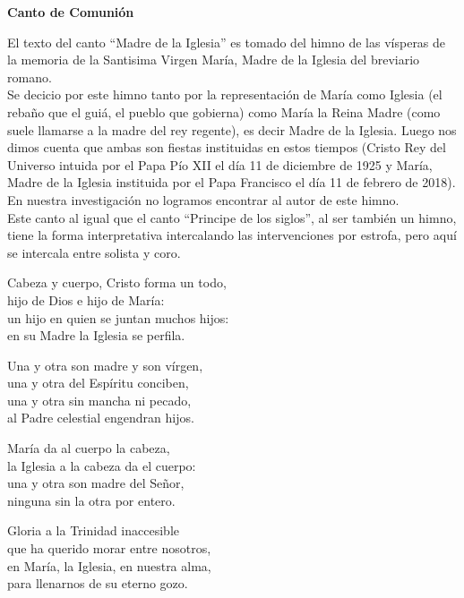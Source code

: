 \documentclass[12pt, letterpaper]{report}
\begin{document}
    \begin{center}
      \LARGE \textbf{Canto de Comuni\'on}
    \end{center}

    \Large El texto del canto ``Madre de la Iglesia'' es tomado del himno de las v\'isperas de la memoria de la Santisima Virgen Mar\'ia, Madre de la Iglesia del breviario romano.\\
    Se decicio por este himno tanto por la representaci\'on de Mar\'ia como Iglesia
    (el reba\~no que el gui\'a, el pueblo que gobierna) como Mar\'ia la Reina Madre (como suele llamarse a la madre del rey regente), es decir Madre de la Iglesia. Luego nos dimos cuenta que ambas son fiestas instituidas en estos tiempos (Cristo Rey del Universo intuida por el Papa P\'io XII el d\'ia 11 de diciembre de 1925 y Mar\'ia, Madre de la Iglesia instituida por el Papa Francisco el d\'ia 11 de febrero de 2018). En nuestra investigaci\'on no logramos encontrar al autor de este himno.\\
    Este canto al igual que el canto ``Principe de los siglos'', al ser tambi\'en un himno, tiene la forma interpretativa intercalando las intervenciones por estrofa, pero aqu\'i se intercala entre solista y coro.

    \noindent
    \LARGE Cabeza y cuerpo, Cristo forma un todo,\\
    hijo de Dios e hijo de Mar\'ia:\\
    un hijo en quien se juntan muchos hijos:\\
    en su Madre la Iglesia se perfila.

    \noindent
    Una y otra son madre y son v\'irgen,\\
    una y otra del Esp\'iritu conciben,\\
    una y otra sin mancha ni pecado,\\
    al Padre celestial engendran hijos.

    \noindent
    Mar\'ia da al cuerpo la cabeza,\\
    la Iglesia a la cabeza da el cuerpo:\\
    una y otra son madre del Se\~nor,\\
    ninguna sin la otra por entero.

    \noindent
    Gloria a la Trinidad inaccesible\\
    que ha querido morar entre nosotros,\\
    en Mar\'ia, la Iglesia, en nuestra alma,\\
    para llenarnos de su eterno gozo.
\end{document}
